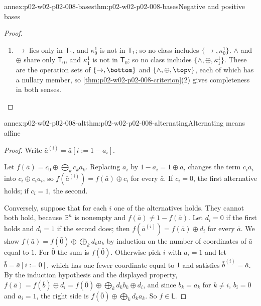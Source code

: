 \begin{annexitem}{annex:p02-w02-p02-008-bases}{thm:p02-w02-p02-008-bases}{Negative and positive bases}
\begin{proof}
\begin{enumerate}
  \(\operatorname{maj}\) in exactly
  \(\mathsf T_0,\mathsf T_1,\mathsf S,\mathsf M\), with intersection
  \(\{\mathsf S\}\).  \(\land\), \(\lor\), \(\kappa^1_0\) and \(\kappa^1_1\)
  lie outside \(\mathsf S\).
\item \(\to\) lies only in \(\mathsf T_1\), and \(\kappa^1_0\) is not in
  \(\mathsf T_1\); so no class includes \(\{\to,\kappa^1_0\}\).  \(\land\)
  and \(\oplus\) share only \(\mathsf T_0\), and \(\kappa^1_1\) is not in
  \(\mathsf T_0\); so no class includes \(\{\land,\oplus,\kappa^1_1\}\).
  These are the operation sets of \(\{\to,\bottom\}\) and
  \(\{\land,\oplus,\topv\}\), each of which has a nullary member, so
  \cref{thm:p02-w02-p02-008-criterion}(2) gives completeness in both senses.
\end{enumerate}
\end{proof}
\end{annexitem}

\begin{annexitem}{annex:p02-w02-p02-008-alt}{thm:p02-w02-p02-008-alternating}{Alternating means affine}
\begin{proof}
Write \(\bar a^{(i)}=\bar a[i{:=}1-a_i]\).

Let \(f(\bar a)=c_0\oplus\bigoplus_kc_ka_k\).  Replacing \(a_i\) by
\(1-a_i=1\oplus a_i\) changes the term \(c_ia_i\) into
\(c_i\oplus c_ia_i\), so \(f(\bar a^{(i)})=f(\bar a)\oplus c_i\) for every
\(\bar a\).  If \(c_i=0\), the first alternative holds; if \(c_i=1\), the
second.

Conversely, suppose that for each \(i\) one of the alternatives holds.  They
cannot both hold, because \(\mathbb B^n\) is nonempty and \(f(\bar a)\neq
1-f(\bar a)\).  Let \(d_i=0\) if the first holds and \(d_i=1\) if the second
does; then \(f(\bar a^{(i)})=f(\bar a)\oplus d_i\) for every \(\bar a\).  We
show \(f(\bar a)=f(\bar0)\oplus\bigoplus_kd_ka_k\) by induction on the number
of coordinates of \(\bar a\) equal to \(1\).  For \(\bar0\) the sum is
\(f(\bar0)\).  Otherwise pick \(i\) with \(a_i=1\) and let
\(\bar b=\bar a[i{:=}0]\), which has one fewer coordinate equal to \(1\) and
satisfies \(\bar b^{(i)}=\bar a\).  By the induction hypothesis and the
displayed property,
\(f(\bar a)=f(\bar b)\oplus d_i=f(\bar0)\oplus\bigoplus_kd_kb_k\oplus d_i\),
and since \(b_k=a_k\) for \(k\neq i\), \(b_i=0\) and \(a_i=1\), the right side
is \(f(\bar0)\oplus\bigoplus_kd_ka_k\).  So \(f\in\mathsf L\).
\end{proof}
\end{annexitem}
